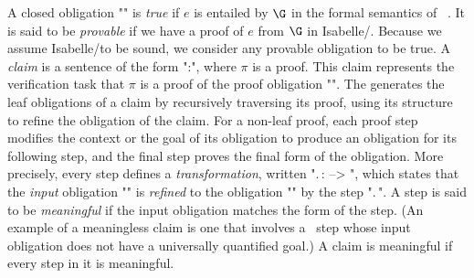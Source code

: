 \documentclass[a4paper]{easychair}
\begin{document}
A closed obligation "" is \textit{true} if $e$ is
entailed by $\G$ in the formal semantics of
\tlaplus~\cite{lamport03tla}. It is said to be \emph{provable} if we
have a proof of $e$ from $\G$ in Isabelle/\tlaplus. Because we assume
Isabelle/\tlaplus to be sound, we consider any provable obligation to
be true.  A \emph{claim} is a sentence of the form "\pi:", where $\pi$ is a \tlatwo proof.  This claim represents the
verification task that $\pi$ is a proof of the proof obligation
"". The \PM generates the leaf obligations of a claim by
recursively traversing its proof, using its structure to refine the
obligation of the claim. For a non-leaf proof, each proof step
modifies the context or the goal of its obligation to produce an
obligation for its following step, and the final \QED step proves the
final form of the obligation. More precisely, every step defines a
\textit{transformation}, written "\sigma.\,\tau:  -->
", which states that the \emph{input} obligation
"" is \emph{refined} to the obligation ""
by the step "\sigma.\,\tau". A step is said to be \textit{meaningful}
if the input obligation matches the form of the step. (An example of a
meaningless claim is one that involves a \TAKE\ step whose input
obligation does not have a universally quantified goal.) A claim is
meaningful if every step in it is meaningful.
\end{document}
